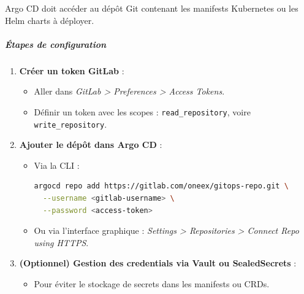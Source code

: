 Argo CD doit accéder au dépôt Git contenant les manifests Kubernetes ou les Helm charts à déployer.

\subparagraph{Étapes de configuration}

\begin{enumerate}
	\item \textbf{Créer un token GitLab} :
	      \begin{itemize}
		      \item Aller dans \emph{GitLab > Preferences > Access Tokens}.
		      \item Définir un token avec les scopes : \texttt{read\_repository}, voire \texttt{write\_repository}.
	      \end{itemize}


	\item \textbf{Ajouter le dépôt dans Argo CD} :
	      \begin{itemize}
		      \item Via la CLI :
		            \begin{lstlisting}[language=bash]
argocd repo add https://gitlab.com/oneex/gitops-repo.git \
  --username <gitlab-username> \
  --password <access-token>
	      	      \end{lstlisting}
		      \item Ou via l’interface graphique : \emph{Settings > Repositories > Connect Repo using HTTPS}.
	      \end{itemize}


	\item \textbf{(Optionnel) Gestion des credentials via Vault ou SealedSecrets} :
	      \begin{itemize}
		      \item Pour éviter le stockage de secrets dans les manifests ou CRDs.
	      \end{itemize}
\end{enumerate}

